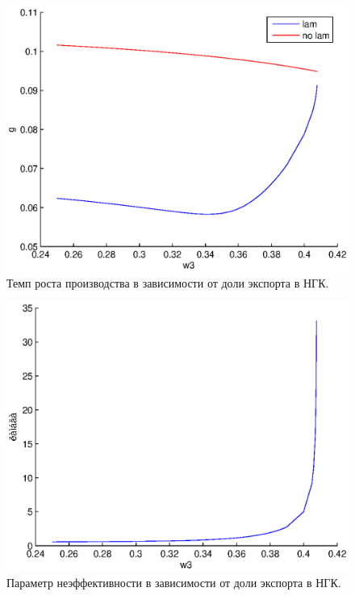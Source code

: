 \documentclass[12pt]{article}
\theoremstyle{rusdef}
\begin{document}
\begin{figure}[h!]
	\centering
	\includegraphics[scale=0.8]{pics/w3_g.eps}
	\caption{Темп роста производства в зависимости от доли экспорта в НГК.}
\end{figure}
\begin{figure}[h!]
	\centering
	\includegraphics[scale=0.8]{pics/w3_lambda.eps}
	\caption{Параметр неэффективности в зависимости от доли экспорта в НГК.}
\end{figure}
\end{document}
